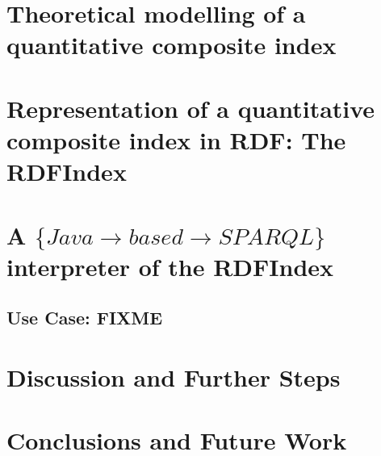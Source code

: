 \documentclass{llncs}
\begin{document}
\section{Theoretical modelling of a quantitative composite index}
\section{Representation of a quantitative composite index in RDF: The RDFIndex}
\section{A $\{Java\rightarrow based \rightarrow SPARQL\}$  interpreter of the RDFIndex}
%
\subsection{Use Case: FIXME}
\section{Discussion and Further Steps}

\section{Conclusions and Future Work}
\end{document}
